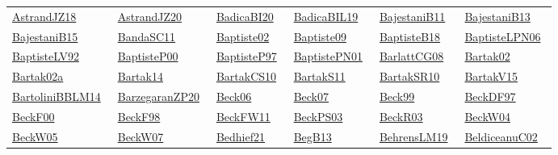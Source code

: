 \begin{longtable}{*{6}{l}}
\href{works/AstrandJZ18.pdf}{AstrandJZ18}~\cite{AstrandJZ18} & \href{works/AstrandJZ20.pdf}{AstrandJZ20}~\cite{AstrandJZ20} & \href{works/BadicaBI20.pdf}{BadicaBI20}~\cite{BadicaBI20} & \href{works/BadicaBIL19.pdf}{BadicaBIL19}~\cite{BadicaBIL19} & \href{works/BajestaniB11.pdf}{BajestaniB11}~\cite{BajestaniB11} & \href{works/BajestaniB13.pdf}{BajestaniB13}~\cite{BajestaniB13}\\ 
\href{works/BajestaniB15.pdf}{BajestaniB15}~\cite{BajestaniB15} & \href{works/BandaSC11.pdf}{BandaSC11}~\cite{BandaSC11} & \href{works/Baptiste02.pdf}{Baptiste02}~\cite{Baptiste02} & \href{works/Baptiste09.pdf}{Baptiste09}~\cite{Baptiste09} & \href{works/BaptisteB18.pdf}{BaptisteB18}~\cite{BaptisteB18} & \href{}{BaptisteLPN06}~\cite{BaptisteLPN06}\\ 
\href{works/BaptisteLV92.pdf}{BaptisteLV92}~\cite{BaptisteLV92} & \href{works/BaptisteP00.pdf}{BaptisteP00}~\cite{BaptisteP00} & \href{works/BaptisteP97.pdf}{BaptisteP97}~\cite{BaptisteP97} & \href{}{BaptistePN01}~\cite{BaptistePN01} & \href{works/BarlattCG08.pdf}{BarlattCG08}~\cite{BarlattCG08} & \href{works/Bartak02.pdf}{Bartak02}~\cite{Bartak02}\\ 
\href{works/Bartak02a.pdf}{Bartak02a}~\cite{Bartak02a} & \href{}{Bartak14}~\cite{Bartak14} & \href{works/BartakCS10.pdf}{BartakCS10}~\cite{BartakCS10} & \href{works/BartakS11.pdf}{BartakS11}~\cite{BartakS11} & \href{works/BartakSR10.pdf}{BartakSR10}~\cite{BartakSR10} & \href{works/BartakV15.pdf}{BartakV15}~\cite{BartakV15}\\ 
\href{works/BartoliniBBLM14.pdf}{BartoliniBBLM14}~\cite{BartoliniBBLM14} & \href{works/BarzegaranZP20.pdf}{BarzegaranZP20}~\cite{BarzegaranZP20} & \href{works/Beck06.pdf}{Beck06}~\cite{Beck06} & \href{works/Beck07.pdf}{Beck07}~\cite{Beck07} & \href{works/Beck99.pdf}{Beck99}~\cite{Beck99} & \href{works/BeckDF97.pdf}{BeckDF97}~\cite{BeckDF97}\\ 
\href{works/BeckF00.pdf}{BeckF00}~\cite{BeckF00} & \href{works/BeckF98.pdf}{BeckF98}~\cite{BeckF98} & \href{works/BeckFW11.pdf}{BeckFW11}~\cite{BeckFW11} & \href{works/BeckPS03.pdf}{BeckPS03}~\cite{BeckPS03} & \href{works/BeckR03.pdf}{BeckR03}~\cite{BeckR03} & \href{works/BeckW04.pdf}{BeckW04}~\cite{BeckW04}\\ 
\href{works/BeckW05.pdf}{BeckW05}~\cite{BeckW05} & \href{works/BeckW07.pdf}{BeckW07}~\cite{BeckW07} & \href{works/Bedhief21.pdf}{Bedhief21}~\cite{Bedhief21} & \href{works/BegB13.pdf}{BegB13}~\cite{BegB13} & \href{works/BehrensLM19.pdf}{BehrensLM19}~\cite{BehrensLM19} & \href{works/BeldiceanuC02.pdf}{BeldiceanuC02}~\cite{BeldiceanuC02}\\ 

\end{longtable}
